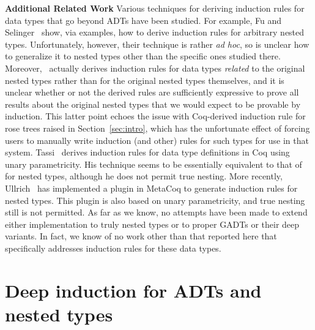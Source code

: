 \documentclass[sigplan,10pt,anonymous,review]{acmart}
\begin{document}
\vspace*{0.05in}

{\bf Additional Related Work\/} Various techniques for deriving
induction rules for data types that go beyond ADTs have been
studied. For example, Fu and Selinger~\cite{fs18} show, via examples,
how to derive induction rules for arbitrary nested
types. Unfortunately, however, their technique is rather {\em ad hoc},
so is unclear how to generalize it to nested types other than the
specific ones studied there. Moreover,~\cite{fs18} actually derives
induction rules for data types {\em related} to the original nested
types rather than for the original nested types themselves, and it is
unclear whether or not the derived rules are sufficiently expressive
to prove all results about the original nested types that we would
expect to be provable by induction. This latter point echoes the issue
with Coq-derived induction rule for rose trees raised in
Section~\ref{sec:intro}, which has the unfortunate effect of forcing
users to manually write induction (and other) rules for such types for
use in that system. Tassi~\cite{tas19} derives induction rules for
data type definitions in Coq using unary parametricity. His technique
seems to be essentially equivalent to that of~\cite{jp19} for nested
types, although he does not permit true nesting. More recently,
Ullrich~\cite{ull20} has implemented a plugin in MetaCoq to generate
induction rules for nested types. This plugin is also based on unary
parametricity, and true nesting still is not permitted.  As far as we
know, no attempts have been made to extend either implementation to
truly nested types or to proper GADTs or their deep variants. In fact,
we know of no work other than that reported here that specifically
addresses induction rules for these data types.

\section{Deep induction for ADTs and nested types}\label{sec:ADTs-and-nesteds}
\end{document}
